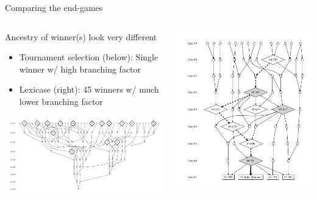 \documentclass{beamer}
\begin{document}
\begin{frame}{Comparing the end-games}
	\begin{columns}
		\begin{column}{0.5 \linewidth}
			Ancestry of winner(s) look very different
			\begin{itemize}
				\item Tournament selection (below): Single winner w/ high branching factor
				\item Lexicase (right): 45 winners w/ much lower branching factor
			\end{itemize}
			\begin{center}
				\includegraphics[width=\linewidth]{Figures/ancestors_of_winner_rswn_tourney_run74_9gens}
			\end{center}
		\end{column}
		\begin{column}{0.5 \linewidth}
			\begin{center}
				\includegraphics[width=\linewidth]{Figures/ancestors_of_winners_colons}
			\end{center}
		\end{column}
	\end{columns}
\end{frame}
\end{document}
